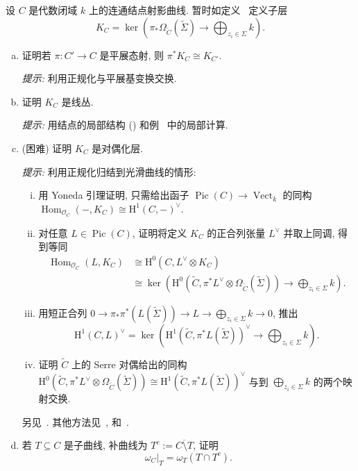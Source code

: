 \begin{exercise}[细节]\label{src:6.2.21}
设 $C$ 是代数闭域 $k$ 上的连通结点射影曲线. 暂时如定义~ 定义子层
\[
K_C=\ker\left(\pi_*\Omega_{\widetilde C}(\widetilde\Sigma)\to\bigoplus_{z_i\in\Sigma}k\right).
\]
\begin{enumerate}[(a)]
\item 证明若 $\pi:C'\to\allowbreak C$ 是平展态射, 则 $\pi^*K_C\cong K_{C'}$.

\textit{提示:} 利用正规化与平展基变换交换.
\item 证明 $K_C$ 是线丛.

\textit{提示:} 用结点的局部结构 () 和例~ 中的局部计算.
\item (困难) 证明 $K_C$ 是对偶化层.

\textit{提示:} 利用正规化归结到光滑曲线的情形:
\begin{enumerate}[(i)]
\item 用 Yoneda 引理证明, 只需给出函子 $\operatorname{Pic}(C)\to\operatorname{Vect}_k$ 的同构 $\operatorname{Hom}_{\mathcal O_C}(-,\allowbreak K_C)\cong\mathrm H^1(C,\allowbreak -)^\vee$.
\item 对任意 $L\in\operatorname{Pic}(C)$, 证明将定义 $K_C$ 的正合列张量 $L^\vee$ 并取上同调, 得到等同
\[
\begin{aligned}
\operatorname{Hom}_{\mathcal O_C}(L,K_C)&\cong\mathrm H^0(C,L^\vee\otimes K_C)\\
&\cong\ker\left(\mathrm H^0(\widetilde C,\pi^*L^\vee\otimes\Omega_{\widetilde C}(\widetilde\Sigma))\to\bigoplus_{z_i\in\Sigma}k\right).
\end{aligned}
\]
\item 用短正合列 $0\to\pi_*\pi^*(L(\widetilde\Sigma))\to\allowbreak L\to\bigoplus_{z_i\in\Sigma}k\to0$, 推出
\[
\mathrm H^1(C,L)^\vee=\ker\left(\mathrm H^1(\widetilde C,\pi^*L(\widetilde\Sigma))^\vee\to\bigoplus_{z_i\in\Sigma}k\right).
\]
\item 证明 $\widetilde C$ 上的 Serre 对偶给出的同构 $\mathrm H^0(\widetilde C,\allowbreak \pi^*L^\vee\otimes\Omega_{\widetilde C}(\widetilde\Sigma))\cong\mathrm H^1(\widetilde C,\allowbreak \pi^*L(\widetilde\Sigma))^\vee$ 与到 $\bigoplus_{z_i\in\Sigma}k$ 的两个映射交换.
\end{enumerate}
另见~\cite[命题 13.2.9]{Ols16}. 其他方法见~\cite[第四章 \S 3]{Ser88}, \cite[引理 10.3.12]{Liu02} 和~\cite[第十章 \S 2]{ACG11}.
\item 若 $T\subseteq C$ 是子曲线, 补曲线为 $T^c:=\overline{C\setminus T}$, 证明
\[
\omega_C|_T=\omega_T(T\cap T^c).
\]
\end{enumerate}
\end{exercise}
